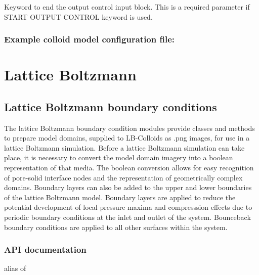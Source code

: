 \documentclass[letterpaper,10pt,english]{sphinxmanual}
\begin{document}
 Keyword to end the output control
input block. This is a required parameter if START OUTPUT CONTROL
keyword is used.


\subsection{Example colloid model configuration file:}
\label{\detokenize{index:example-colloid-model-configuration-file}}


\chapter{Lattice Boltzmann}
\label{\detokenize{index:id3}}

\section{Lattice Boltzmann boundary conditions}
\label{\detokenize{index:lattice-boltzmann-boundary-conditions}}
The lattice Boltzmann boundary condition modules provide classes and methods to prepare model domains, supplied to LB-Colloids as .png images, for use in a lattice Boltzmann simulation. Before a lattice Boltzmann simulation can take place, it is necessary to convert the model domain imagery into a boolean representation of that media. The boolean conversion allows for easy recognition of pore-solid interface nodes and the representation of geometrically complex domains. Boundary layers can also be added to the upper and lower boundaries of the lattice Boltzmann model. Boundary layers are applied to reduce the potential development of local pressure maxima and compresssion effects due to periodic boundary conditions at the inlet and outlet of the system. Bounceback boundary conditions are applied to all other surfaces within the system.


\subsection{API documentation}
\label{\detokenize{index:api-documentation}}\label{\detokenize{index:module-lb_colloids}}

\begin{fulllineitems}
\label{\detokenize{index:lb_colloids.LBImage}}
alias of {\hyperref[\detokenize{index:module-lb_colloids.LB.LB_2Dimage}]{}}

\end{fulllineitems}
\end{document}
